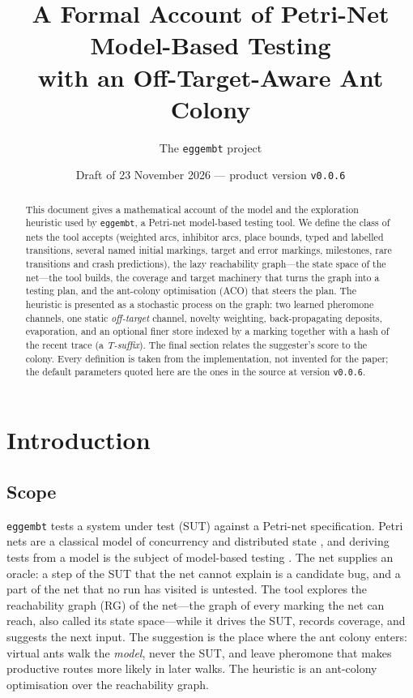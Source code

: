 \documentclass[11pt,a4paper]{article}
\title{\textbf{A Formal Account of Petri-Net Model-Based Testing\\
with an Off-Target-Aware Ant Colony}}
\author{The \texttt{eggembt} project}
\date{Draft of 23 November 2026 --- product version \texttt{v0.0.6}}
\begin{document}
\maketitle

\begin{abstract}
This document gives a mathematical account of the model and the exploration
heuristic used by \texttt{eggembt}, a Petri-net model-based testing tool.  We
define the class of nets the tool accepts (weighted arcs, inhibitor arcs,
place bounds, typed and labelled transitions, several named initial markings,
target and error markings, milestones, rare transitions and crash
predictions), the lazy reachability graph---the state space of the net---the
tool builds, the coverage and target machinery that turns the graph into a
testing plan, and the ant-colony optimisation (ACO) that steers the plan.  The heuristic is
presented as a stochastic process on the graph: two learned pheromone
channels, one static \emph{off-target} channel, novelty weighting,
back-propagating deposits, evaporation, and an optional finer store indexed
by a marking together with a hash of the recent trace (a \emph{T-suffix}).
The final section relates the suggester's score to the colony.  Every
definition is taken from the implementation, not invented for the paper; the
default parameters quoted here are the ones in the source at version
\texttt{v0.0.6}.
\end{abstract}

\tableofcontents

\section{Introduction}

\subsection{Scope}

\texttt{eggembt} tests a system under test (SUT) against a Petri-net
specification.  Petri nets are a classical model of concurrency and
distributed state \cite{murata1989petri}, and deriving tests from a model is
the subject of model-based testing \cite{utting2007practical,utting2012taxonomy}.
The net supplies an oracle: a step of the SUT that the net
cannot explain is a candidate bug, and a part of the net that no run has
visited is untested.  The tool explores the reachability graph (RG) of the
net---the graph of every marking the net can reach, also called its state
space---while it drives the SUT, records coverage, and suggests the next
input.  The suggestion is the place where the ant colony enters: virtual ants walk the
\emph{model}, never the SUT, and leave pheromone that makes productive routes
more likely in later walks.  The heuristic is an ant-colony optimisation
\cite{dorigo1996ants,dorigo2004aco} over the reachability graph.
\end{document}
